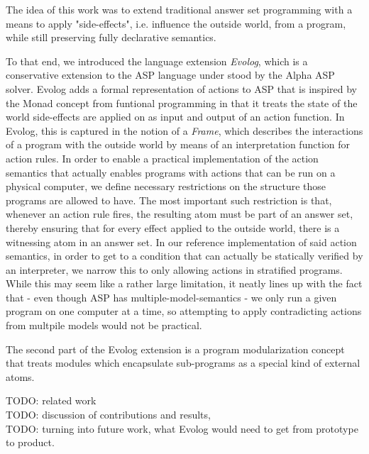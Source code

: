 The idea of this work was to extend traditional answer set programming with a means to apply "side-effects", i.e. influence the outside world, from a program, while still preserving fully declarative semantics. 

To that end, we introduced the language extension \emph{Evolog}, which is a conservative extension to the ASP language under stood by the Alpha ASP solver. Evolog adds a formal representation of actions to ASP that is inspired by the Monad concept from funtional programming in that it treats the state of the world side-effects are applied on as input and output of an action function. In Evolog, this is captured in the notion of a \emph{Frame}, which describes the interactions of a program with the outside world by means of an interpretation function for action rules. In order to enable a practical implementation of the action semantics that actually enables programs with actions that can be run on a physical computer, we define necessary restrictions on the structure those programs are allowed to have. The most important such restriction is that, whenever an action rule fires, the resulting atom must be part of an answer set, thereby ensuring that for every effect applied to the outside world, there is a witnessing atom in an answer set. In our reference implementation of said action semantics, in order to get to a condition that can actually be statically verified by an interpreter, we narrow this to only allowing actions in stratified programs. While this may seem like a rather large limitation, it neatly lines up with the fact that - even though ASP has multiple-model-semantics - we only run a given program on one computer at a time, so attempting to apply contradicting actions from multpile models would not be practical.

The second part of the Evolog extension is a program modularization concept that treats modules which encapsulate sub-programs as a special kind of external atoms.

TODO: related work\\
TODO: discussion of contributions and results,\\
TODO: turning into future work, what Evolog would need to get from prototype to product.